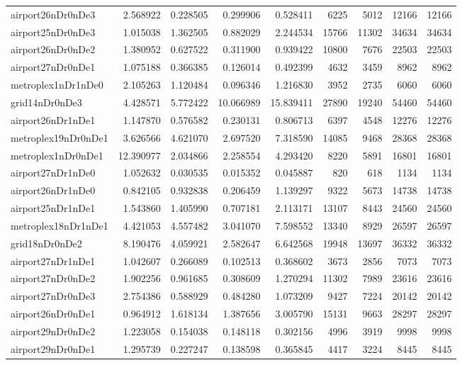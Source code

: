 \begin{longtable}{|l|r|r|r|r|r|r|r|r|}
airport26nDr0nDe3 & 2.568922 & 0.228505 & 0.299906 & 0.528411 & 6225 & 5012 & 12166 & 12166 \\
airport25nDr0nDe3 & 1.015038 & 1.362505 & 0.882029 & 2.244534 & 15766 & 11302 & 34634 & 34634 \\
airport26nDr0nDe2 & 1.380952 & 0.627522 & 0.311900 & 0.939422 & 10800 & 7676 & 22503 & 22503 \\
airport27nDr0nDe1 & 1.075188 & 0.366385 & 0.126014 & 0.492399 & 4632 & 3459 & 8962 & 8962 \\
metroplex1nDr1nDe0 & 2.105263 & 1.120484 & 0.096346 & 1.216830 & 3952 & 2735 & 6060 & 6060 \\
grid14nDr0nDe3 & 4.428571 & 5.772422 & 10.066989 & 15.839411 & 27890 & 19240 & 54460 & 54460 \\
airport26nDr1nDe1 & 1.147870 & 0.576582 & 0.230131 & 0.806713 & 6397 & 4548 & 12276 & 12276 \\
metroplex19nDr0nDe1 & 3.626566 & 4.621070 & 2.697520 & 7.318590 & 14085 & 9468 & 28368 & 28368 \\
metroplex1nDr0nDe1 & 12.390977 & 2.034866 & 2.258554 & 4.293420 & 8220 & 5891 & 16801 & 16801 \\
airport27nDr1nDe0 & 1.052632 & 0.030535 & 0.015352 & 0.045887 & 820 & 618 & 1134 & 1134 \\
airport26nDr1nDe0 & 0.842105 & 0.932838 & 0.206459 & 1.139297 & 9322 & 5673 & 14738 & 14738 \\
airport25nDr1nDe1 & 1.543860 & 1.405990 & 0.707181 & 2.113171 & 13107 & 8443 & 24560 & 24560 \\
metroplex18nDr1nDe1 & 4.421053 & 4.557482 & 3.041070 & 7.598552 & 13340 & 8929 & 26597 & 26597 \\
grid18nDr0nDe2 & 8.190476 & 4.059921 & 2.582647 & 6.642568 & 19948 & 13697 & 36332 & 36332 \\
airport27nDr1nDe1 & 1.042607 & 0.266089 & 0.102513 & 0.368602 & 3673 & 2856 & 7073 & 7073 \\
airport27nDr0nDe2 & 1.902256 & 0.961685 & 0.308609 & 1.270294 & 11302 & 7989 & 23616 & 23616 \\
airport27nDr0nDe3 & 2.754386 & 0.588929 & 0.484280 & 1.073209 & 9427 & 7224 & 20142 & 20142 \\
airport26nDr0nDe1 & 0.964912 & 1.618134 & 1.387656 & 3.005790 & 15131 & 9663 & 28297 & 28297 \\
airport29nDr0nDe2 & 1.223058 & 0.154038 & 0.148118 & 0.302156 & 4996 & 3919 & 9998 & 9998 \\
airport29nDr0nDe1 & 1.295739 & 0.227247 & 0.138598 & 0.365845 & 4417 & 3224 & 8445 & 8445 \\

\end{longtable}
